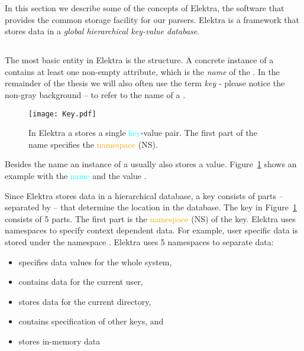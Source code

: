 In this section we describe some of the concepts of Elektra, the software that provides the common storage facility for our  parsers. Elektra is a framework that stores data in a \emph{global hierarchical key-value database}.

\subsection{}

The most basic entity in Elektra is the  structure. A concrete instance of a  contains at least one non-empty attribute, which is the \emph{name} of the . In the remainder of the thesis we will also often use the term \emph{key} - please notice the non-gray background – to refer to the name of a .

\begin{figure}
  \centering
    \texttt{[image: Key.pdf]}
  \caption{In Elektra a  stores a single \textcolor{Aqua}{key}-\textcolor{Purple3}{value} pair. The first part of the name specifies the \textcolor{orange}{namespace} (NS).}
  \label{fig:key}
\end{figure}

Besides the name an instance of a  usually also stores a value. Figure~\ref{fig:key} shows an example  with the \textcolor{Aqua}{name}  and the \textcolor{Purple3}{value} .

Since Elektra stores data in a hierarchical database, a key consists of parts – separated by \code{/} – that determine the location in the database. The key in Figure~\ref{fig:key} consists of 5 parts. The first part  is the \textcolor{orange}{namespace} (NS) of the key. Elektra uses namespaces to specify context dependent data. For example, user specific data is stored under the namespace . Elektra uses 5 namespaces to separate data:

\begin{itemize}[style=multiline, leftmargin=1.8cm]
  \item [\code{system}] specifies data values for the whole system,
  \item [\code{user}] contains data for the current user,
  \item [\code{dir}] stores data for the current directory,
  \item [\code{spec}] contains specification of other keys, and
  \item [\code{proc}] stores in-memory data
\end{itemize}

